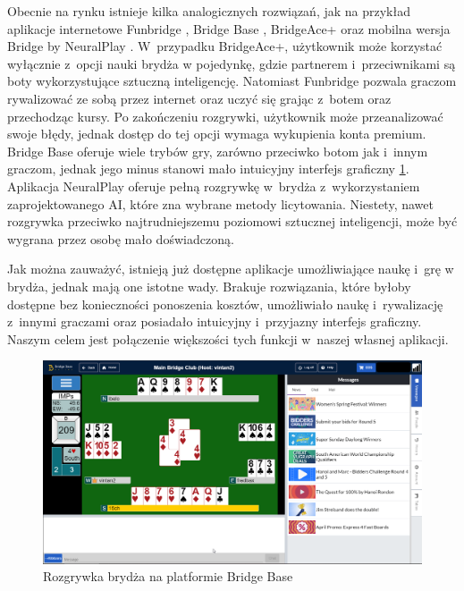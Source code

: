 Obecnie na rynku istnieje kilka analogicznych rozwiązań, jak na przykład
aplikacje internetowe Funbridge \cite{funbridge}, Bridge Base \cite{bridgebase},
BridgeAce+ \cite{bridgeace} oraz mobilna wersja Bridge by NeuralPlay
\cite{neuralplay}. W~przypadku BridgeAce+, użytkownik może korzystać wyłącznie
z~opcji nauki brydża w pojedynkę, gdzie partnerem i~przeciwnikami są boty
wykorzystujące sztuczną inteligencję. Natomiast Funbridge pozwala graczom
rywalizować ze sobą przez internet oraz uczyć się grając z~botem oraz
przechodząc kursy. Po zakończeniu rozgrywki, użytkownik może przeanalizować
swoje błędy, jednak dostęp do tej opcji wymaga wykupienia konta premium.
Bridge Base oferuje wiele trybów gry, zarówno przeciwko botom jak i~innym
graczom, jednak jego minus stanowi mało intuicyjny interfejs graficzny
\ref{fig:bridge-base}. Aplikacja NeuralPlay oferuje pełną rozgrywkę w~brydża
z~wykorzystaniem zaprojektowanego AI, które zna wybrane metody licytowania.
Niestety, nawet rozgrywka przeciwko najtrudniejszemu poziomowi sztucznej
inteligencji, może być wygrana przez osobę mało doświadczoną.
\newline

Jak można zauważyć, istnieją już dostępne aplikacje umożliwiające naukę
i~grę w brydża, jednak mają one istotne wady. Brakuje rozwiązania, które
byłoby dostępne bez konieczności ponoszenia kosztów, umożliwiało naukę
i~rywalizację z~innymi graczami oraz posiadało intuicyjny i~przyjazny
interfejs graficzny. Naszym celem jest połączenie większości tych funkcji
w~naszej własnej aplikacji.

\begin{figure}[h]
  \centering
  \includegraphics[width=\textwidth]{img/brydz-platformy/bridgebase.png}
  \caption{Rozgrywka brydża na platformie Bridge Base}
  \label{fig:bridge-base}
\end{figure}

